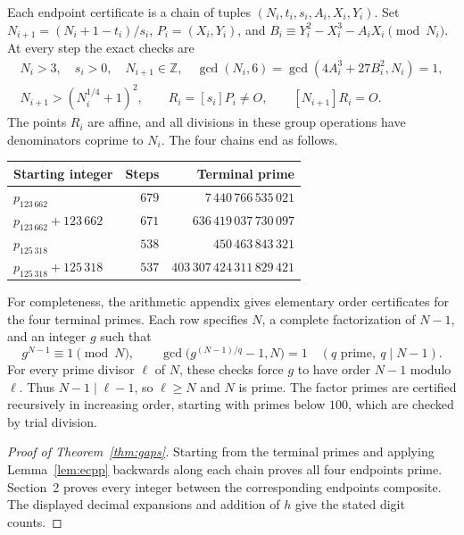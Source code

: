 \documentclass[11pt]{amsart}
\begin{document}
Each endpoint certificate is a chain of tuples $(N_i,t_i,s_i,A_i,X_i,Y_i)$.
Set $N_{i+1}=(N_i+1-t_i)/s_i$, $P_i=(X_i,Y_i)$, and
$B_i\equiv Y_i^2-X_i^3-A_iX_i\pmod{N_i}$. At every step the exact checks are
\begin{equation}\label{eq:checks}
\begin{gathered}
 N_i>3,\quad s_i>0,\quad N_{i+1}\in\mathbb Z,\quad
 \gcd(N_i,6)=\gcd(4A_i^3+27B_i^2,N_i)=1,\\
 N_{i+1}>(N_i^{1/4}+1)^2,\qquad
 R_i=[s_i]P_i\ne O,\qquad [N_{i+1}]R_i=O.
\end{gathered}
\end{equation}
The points $R_i$ are affine, and all divisions in these group operations
have denominators coprime to $N_i$. The four chains end as follows.
\begin{center}
\begin{tabular}{l r r}
\toprule
Starting integer & Steps & Terminal prime\\
\midrule
$p_{123\,662}$ & $679$ & $7\,440\,766\,535\,021$\\
$p_{123\,662}+123\,662$ & $671$ & $636\,419\,037\,730\,097$\\
$p_{125\,318}$ & $538$ & $450\,463\,843\,321$\\
$p_{125\,318}+125\,318$ & $537$ & $403\,307\,424\,311\,829\,421$\\
\bottomrule
\end{tabular}
\end{center}
For completeness, the arithmetic appendix gives elementary order
certificates for the four terminal primes. Each row specifies $N$, a
complete factorization of $N-1$, and an integer $g$ such that
\[
 g^{N-1}\equiv1\pmod N,\qquad
 \gcd\bigl(g^{(N-1)/q}-1,N\bigr)=1\quad(q\text{ prime},\ q\mid N-1).
\]
For every prime divisor $\ell$ of $N$, these checks force $g$ to have order
$N-1$ modulo $\ell$. Thus $N-1\mid\ell-1$, so $\ell\ge N$ and $N$ is prime.
The factor primes are certified recursively in increasing order, starting
with primes below $100$, which are checked by trial division.

\begin{proof}[Proof of Theorem~\ref{thm:gaps}]
Starting from the terminal primes and applying Lemma~\ref{lem:ecpp}
backwards along each chain proves all four endpoints prime. Section~2
proves every integer between the corresponding endpoints composite.
The displayed decimal expansions and addition of $h$ give the stated
digit counts.
\end{proof}
\end{document}
